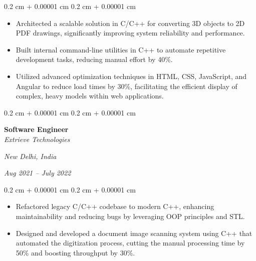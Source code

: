 \documentclass[10pt, letterpaper]{article}
\newenvironment{highlights}{
    \begin{itemize}[
        topsep=0.10 cm,
        parsep=0.10 cm,
        partopsep=0pt,
        itemsep=0pt,
        leftmargin=0.4 cm + 10pt
    ]
}{
    \end{itemize}
} %
\newenvironment{onecolentry}{
    \begin{adjustwidth}{
        0.2 cm + 0.00001 cm
    }{
        0.2 cm + 0.00001 cm
    }
}{
    \end{adjustwidth}
} %
\newenvironment{twocolentry}[2][]{
    \onecolentry
    \def\secondColumn{#2}
    \setcolumnwidth{\fill, 4.5 cm}
    \begin{paracol}{2}
}{
    \switchcolumn \raggedleft \secondColumn
    \end{paracol}
    \endonecolentry
} %
\begin{document}
    \vspace{0.10 cm}
        \begin{onecolentry}
            \begin{highlights}
                \item Architected a scalable solution in C/C++ for converting 3D objects to 2D PDF drawings, significantly improving system reliability and performance.
                \item Built internal command-line utilities in C++ to automate repetitive development tasks, reducing manual effort by 40\%.
                \item Utilized advanced optimization techniques in HTML, CSS, JavaScript, and Angular to reduce load times by 30\%, facilitating the efficient display of complex, heavy models within web applications.
            \end{highlights}
        \end{onecolentry}

        \begin{twocolentry}{
        \textit{New Delhi, India}    
            
        \textit{Aug 2021 – July 2022}}
            \textbf{Software Engineer} \\
            \textit{Extrieve Technologies}
        \end{twocolentry}

        \vspace{0.10 cm}
        \begin{onecolentry}
            \begin{highlights}
                \item Refactored legacy C/C++ codebase to modern C++, enhancing maintainability and reducing bugs by leveraging OOP principles and STL.
                \item Designed and developed a document image scanning system using C++ that automated the digitization process, cutting the manual processing time by 50\% and boosting throughput by 30\%.
            \end{highlights}
        \end{onecolentry}
\end{document}
